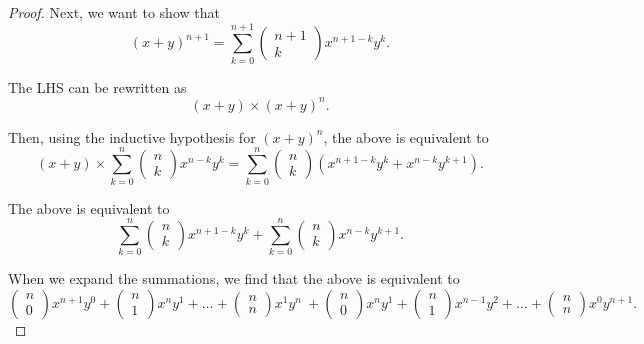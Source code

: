 \documentclass[11pt]{article}
\begin{document}
\begin{enumerate}
\begin{proof}
Next, we want to show that 
\[
(x+y)^{n+1} = \sum_{k=0}^{n+1}  \left(\begin{array}{c} n+1\\ k\end{array}\right) x^{n+1-k}y^k.
\]

The LHS can be rewritten as
\[
(x+y) \times (x+y)^n.
\]

Then, using the inductive hypothesis for $(x+y)^n$, the above is equivalent to
\[
(x+y) \times \sum_{k=0}^{n}  \left(\begin{array}{c} n\\ k\end{array}\right) x^{n-k}y^k = \sum_{k=0}^{n}  \left(\begin{array}{c} n\\ k\end{array}\right) \left(x^{n+1-k}y^k + x^{n-k}y^{k+1}\right).
\] 

The above is equivalent to
\[
\sum_{k=0}^{n}  \left(\begin{array}{c} n\\ k\end{array}\right) x^{n+1-k}y^k + \sum_{k=0}^{n}  \left(\begin{array}{c} n\\ k\end{array}\right) x^{n-k}y^{k+1}.
\]

When we expand the summations, we find that the above is equivalent to
\[
\left(\begin{array}{c} n\\ 0\end{array}\right)x^{n+1} y^0 + \left(\begin{array}{c} n\\ 1\end{array}\right)x^n y^1 + \dots + \left(\begin{array}{c} n\\ n\end{array}\right)x^1y^n\ + \left(\begin{array}{c} n\\ 0\end{array}\right)x^{n} y^1 + \left(\begin{array}{c} n\\ 1\end{array}\right)x^{n-1} y^2 + \dots + \left(\begin{array}{c} n\\ n\end{array}\right)x^0y^{n+1}.
\]


\end{proof}
\end{enumerate}
\end{document}
